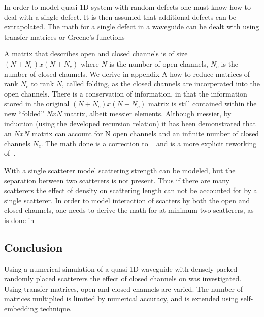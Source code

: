 In order to model quasi-1D system with random defects one must know how to 
deal with a single defect. It is then assumed that additional defects can be
extrapolated. The math for a single defect in a waveguide can be dealt with 
using transfer matrices or Greene's functions %

A matrix that describes open and closed channels is of size $(N+N_c)x(N+N_c)$
where $N$ is the number of open channels, $N_c$ is the number of closed channels.
We derive in appendix A how to reduce matrices of rank $N_c$ to rank $N$,
called folding, as the closed channels are incorperated into the open channels.
There is a conservation of information, in that the information stored in the original
$(N+N_c)x(N+N_c)$ matrix is still contained within the new ``folded'' $NxN$
matrix, albeit messier elements.  Although messier, by
induction (using the developed recursion relation) it has been demonstrated that 
an $NxN$ matrix can account for N open channels and an infinite number of closed channels $N_c$.  The math
done is a correction to ~\cite{1990_Bagwell} and is a more explicit reworking of~\cite{1991_Kumar_Bagwell}.

With a single scatterer model scattering strength can be modeled, 
but the separation between two scatterers is not present. Thus if 
there are many scatterers the effect of density on scattering length can not
be accounted for by a single scatterer. In order to model interaction of 
scatters by both the open and closed channels, one needs to derive the math
for at minimum two scatterers, as is done in %

\subsection {Conclusion}

Using a numerical simulation of a quasi-1D waveguide with densely packed
randomly placed scatterers the effect of closed channels on was investigated.
Using transfer matrices, open and closed channels are varied.  The number of
matrices multiplied is limited by numerical accuracy, and is extended using self-embedding technique.

